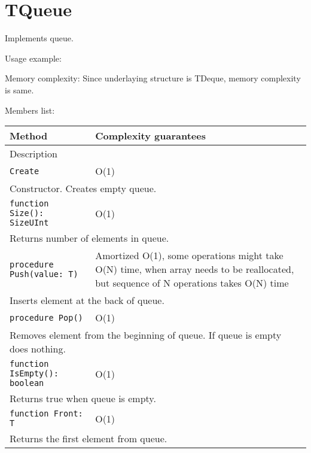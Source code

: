 \chapter{TQueue}

Implements queue.

Usage example:



Memory complexity:
Since underlaying structure is TDeque, memory complexity is same.

Members list:

\begin{longtable}{|m{10cm}|m{5cm}|}
\hline
Method & Complexity guarantees \\ \hline
\multicolumn{2}{|m{15cm}|}{Description} \\ \hline\hline

\verb!Create! & O(1) \\ \hline
\multicolumn{2}{|m{15cm}|}{Constructor. Creates empty queue.} \\ \hline\hline

\verb!function Size(): SizeUInt! & O(1) \\ \hline
\multicolumn{2}{|m{15cm}|}{Returns number of elements in queue.} \\\hline\hline

\verb!procedure Push(value: T)! &  Amortized
O(1), some operations might take O(N) time, when array needs to be reallocated, but sequence of N
operations takes O(N) time \\ \hline
\multicolumn{2}{|m{15cm}|}{Inserts element at the back of queue.} \\\hline\hline

\verb!procedure Pop()! & O(1) \\\hline
\multicolumn{2}{|m{15cm}|}{Removes element from the beginning of queue. If queue is empty does nothing.} \\\hline\hline

\verb!function IsEmpty(): boolean! & O(1) \\ \hline
\multicolumn{2}{|m{15cm}|}{Returns true when queue is empty.} \\\hline\hline

\verb!function Front: T! & O(1) \\\hline
\multicolumn{2}{|m{15cm}|}{Returns the first element from queue.} \\\hline

\end{longtable}
